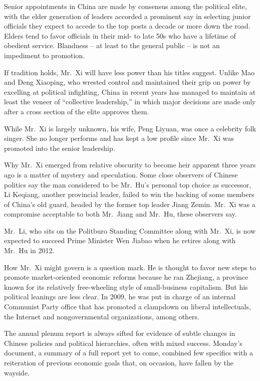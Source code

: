 ﻿\documentclass[12pt]{article}
\begin{document}
Senior appointments in China are made by consensus among the political elite, with the elder
generation of leaders accorded a prominent say in selecting junior officials they expect to accede
to the top posts a decade or more down the road. Elders tend to favor officials in their mid- to
late 50s who have a lifetime of obedient service. Blandness -- at least to the general public -- is
not an impediment to promotion.

If tradition holds, Mr.~Xi will have less power than his titles suggest. Unlike Mao and Deng
Xiaoping, who wrested control and maintained their grip on power by excelling at political
infighting, China in recent years has managed to maintain at least the veneer of ``collective
leadership,'' in which major decisions are made only after a cross section of the elite approves
them.

While Mr.~Xi is largely unknown, his wife, Peng Liyuan, was once a celebrity folk singer. She no
longer performs and has kept a low profile since Mr.~Xi was promoted into the senior leadership.

Why Mr.~Xi emerged from relative obscurity to become heir apparent three years ago is a matter of
mystery and speculation. Some close observers of Chinese politics say the man considered to be
Mr.~Hu's personal top choice as successor, Li Keqiang, another provincial leader, failed to win the
backing of some members of China's old guard, headed by the former top leader Jiang Zemin. Mr.~Xi
was a compromise acceptable to both Mr.~Jiang and Mr.~Hu, these observers say.

Mr.~Li, who sits on the Politburo Standing Committee along with Mr.~Xi, is now expected to succeed
Prime Minister Wen Jiabao when he retires along with Mr.~Hu in 2012.

How Mr.~Xi might govern is a question mark. He is thought to favor new steps to promote
market-oriented economic reforms because he ran Zhejiang, a province known for its relatively
free-wheeling style of small-business capitalism. But his political leanings are less clear. In
2009, he was put in charge of an internal Communist Party office that has promoted a clampdown on
liberal intellectuals, the Internet and nongovernmental organizations, among others.

The annual plenum report is always sifted for evidence of subtle changes in Chinese policies and
political hierarchies, often with mixed success. Monday's document, a summary of a full report yet
to come, combined few specifics with a reiteration of previous economic goals that, on occasion,
have fallen by the wayside.
\end{document}
